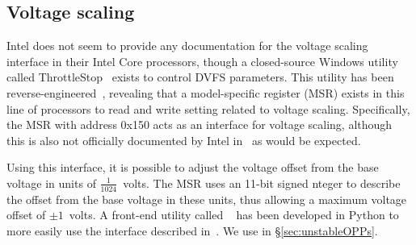 \subsection{Voltage scaling}
\label{sec:undervolt}

Intel does not seem to provide any documentation for the voltage
scaling interface in their Intel Core processors, though a closed-source
Windows utility called ThrottleStop~\cite{throttlestop} exists to control DVFS
parameters. This utility has been reverse-engineered~\cite{elersicDoc},
revealing that a model-specific register (MSR) exists in this line of processors
to read and write setting related to voltage scaling. Specifically, the MSR with
address 0x150 acts as an interface for voltage scaling, although this is also
not officially documented by Intel in~\cite[Vol. 4, §2.13]{intelDevManual} as
would be expected.

Using this interface, it is possible to adjust the voltage offset from the base
voltage in units of $\frac{1}{1024}$~volts. The MSR uses an 11-bit signed 
nteger to describe the offset from the base voltage in these units, thus
allowing a maximum voltage offset of $\pm{1}$~volts. A front-end utility called
~\cite{whewellUndervolt} has been developed in Python to more
easily use the interface described in~\cite{elersicDoc}. We use 
in §\ref{sec:unstableOPPs}.

